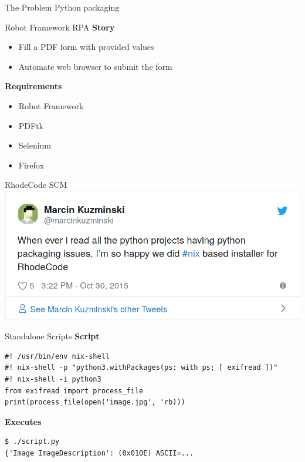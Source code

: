 \documentclass[12pt,aspectratio=169]{beamer}
\begin{document}

\begin{frame}{The Problem}
  \center\Huge
  Python packaging 
\end{frame}


\begin{frame}{Robot Framework RPA}
  \textbf{Story}
  \begin{itemize}
    \item Fill a PDF form with provided values
    \item Automate web browser to submit the form
  \end{itemize}
  \textbf{Requirements}
  \begin{itemize}
    \item Robot Framework
    \item PDFtk
    \item Selenium
    \item Firefox
  \end{itemize}
\end{frame}


\begin{frame}{RhodeCode SCM}
\includegraphics[width=0.70\paperwidth]{images/rhodecode-tweet.png}
\end{frame}


\begin{frame}[fragile]{Standalone Scripts}
  \textbf{Script}
  \begin{verbatim}
#! /usr/bin/env nix-shell
#! nix-shell -p "python3.withPackages(ps: with ps; [ exifread ])"
#! nix-shell -i python3
from exifread import process_file
print(process_file(open('image.jpg', 'rb)))
  \end{verbatim}
  \textbf{Executes}
  \begin{verbatim}
$ ./script.py
{'Image ImageDescription': (0x010E) ASCII=...
  \end{verbatim}
\end{frame}
\end{document}
